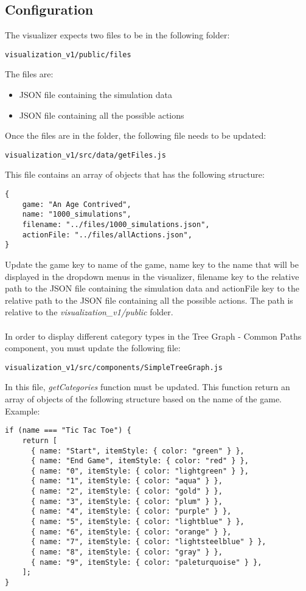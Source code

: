 \documentclass{article}
\begin{document}
\subsection{Configuration}
The visualizer expects two files to be in the following folder:
\begin{lstlisting}
visualization_v1/public/files
\end{lstlisting}
The files are:
\begin{itemize}
    \item JSON file containing the simulation data
    \item JSON file containing all the possible actions
\end{itemize}
Once the files are in the folder, the following file needs to be updated:
\begin{lstlisting}
visualization_v1/src/data/getFiles.js
\end{lstlisting}
This file contains an array of objects that has the following structure:
\begin{lstlisting}
{
    game: "An Age Contrived",
    name: "1000_simulations",
    filename: "../files/1000_simulations.json",
    actionFile: "../files/allActions.json",
}
\end{lstlisting}
Update the game key to name of the game, name key to the name that will be displayed in the dropdown menus in the visualizer, filename key to the relative path to the JSON file containing the simulation data and actionFile  key to the relative path to the JSON file containing all the possible actions.
The path is relative to the \textit{visualization\_v1/public} folder.
\\\\
In order to display different category types in the Tree Graph - Common Paths component, you must update the following file:
\begin{lstlisting}
visualization_v1/src/components/SimpleTreeGraph.js
\end{lstlisting}
In this file, \textit{getCategories} function must be updated. This function return an array of objects of the following structure based on the name of the game. Example:
\begin{lstlisting}
if (name === "Tic Tac Toe") {
    return [
      { name: "Start", itemStyle: { color: "green" } },
      { name: "End Game", itemStyle: { color: "red" } },
      { name: "0", itemStyle: { color: "lightgreen" } },
      { name: "1", itemStyle: { color: "aqua" } },
      { name: "2", itemStyle: { color: "gold" } },
      { name: "3", itemStyle: { color: "plum" } },
      { name: "4", itemStyle: { color: "purple" } },
      { name: "5", itemStyle: { color: "lightblue" } },
      { name: "6", itemStyle: { color: "orange" } },
      { name: "7", itemStyle: { color: "lightsteelblue" } },
      { name: "8", itemStyle: { color: "gray" } },
      { name: "9", itemStyle: { color: "paleturquoise" } },
    ];
}
\end{lstlisting}
\end{document}
